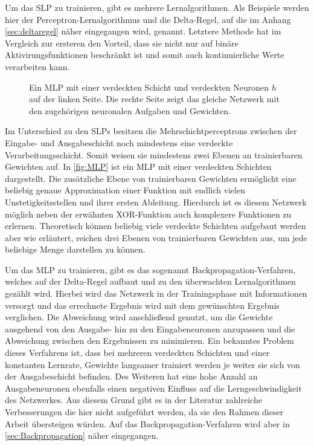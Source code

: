 Um das SLP zu trainieren, gibt es mehrere Lernalgorithmen. Als Beispiele werden hier der Perceptron-Lernalgorithmus und die Delta-Regel, auf die im Anhang \ref{sec:deltaregel} näher eingegangen wird, genannt. Letztere Methode hat im Vergleich zur ersteren den Vorteil, dass sie nicht nur auf binäre Aktivirungsfunktionen beschränkt ist und somit auch kontinuierliche Werte verarbeiten kann.
\\

\begin{figure}[!htb]
    \centering
        
    \caption{Ein MLP mit einer verdeckten Schicht und verdeckten Neuronen $h$ auf der linken Seite. Die rechte Seite zeigt das gleiche Netzwerk mit den zugehörigen neuronalen Aufgaben und Gewichten.}
    \label{fig:MLP}
\end{figure}

Im Unterschied zu den SLPs besitzen die Mehrschichtperceptrons zwischen der Eingabe- und Ausgabeschicht noch mindestens eine verdeckte Verarbeitungsschicht. Somit weisen sie mindestens zwei Ebenen an trainierbaren Gewichten auf. In \autoref{fig:MLP} ist ein MLP mit einer verdeckten Schichten dargestellt. Die zusätzliche Ebene von trainierbaren Gewichten ermöglicht eine beliebig genaue Approximation einer Funktion mit endlich vielen Unstetigkeitsstellen und ihrer ersten Ableitung. Hierdurch ist es diesem Netzwerk möglich neben der erwähnten XOR-Funktion auch komplexere Funktionen zu erlernen. Theoretisch können beliebig viele verdeckte Schichten aufgebaut werden aber wie \hbox{\citet{dkriesel07}} erläutert, reichen drei Ebenen von trainierbaren Gewichten aus, um jede beliebige Menge darstellen zu können.

Um das MLP zu trainieren, gibt es das sogenannt Backpropagation-Verfahren, welches auf der Delta-Regel aufbaut und zu den überwachten Lernalgorithmen gezählt wird. Hierbei wird das Netzwerk in der Trainingsphase mit Informationen versorgt und das errechnete Ergebnis wird mit dem gewünschten Ergebnis verglichen. Die Abweichung wird anschließend genutzt, um die Gewichte ausgehend von den Ausgabe- hin zu den Eingabeneuronen anzupassen und die Abweichung zwischen den Ergebnissen zu minimieren. Ein bekanntes Problem dieses Verfahrens ist, dass bei mehreren verdeckten Schichten und einer konstanten Lernrate, Gewichte langsamer trainiert werden je weiter sie sich von der Ausgabeschicht befinden. Des Weiteren hat eine hohe Anzahl an Ausgabeneuronen ebenfalls einen negativen Einfluss auf die Lerngeschwindigkeit des Netzwerkes. Aus diesem Grund gibt es in der Literatur zahlreiche Verbesserungen die hier nicht aufgeführt werden, da sie den Rahmen dieser Arbeit übersteigen würden. Auf das Backpropagation-Verfahren wird aber in \autoref{sec:Backpropagation} näher eingegangen. 


